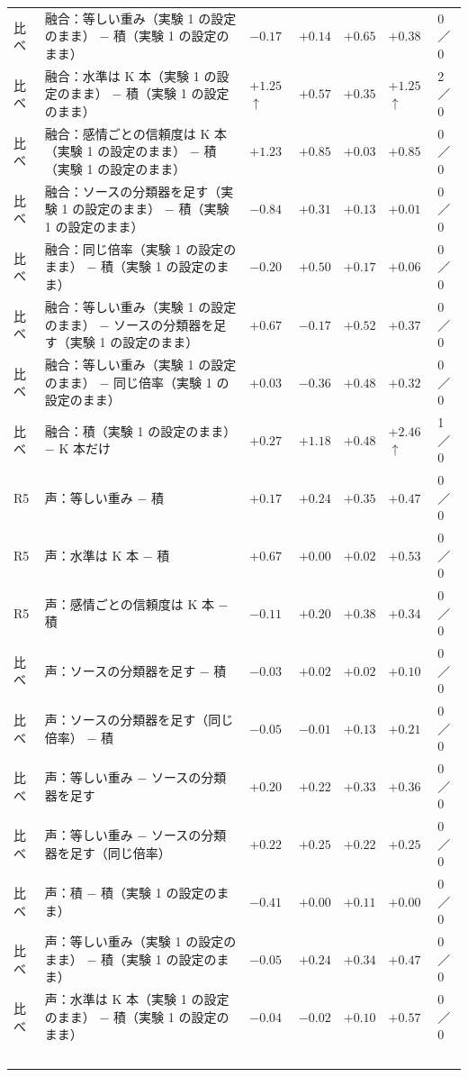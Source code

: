 \begin{longtable}{>{\raggedright}p{0.75cm}>{\raggedright}p{5.6cm}>{\raggedright}p{2.05cm}>{\raggedright}p{2.05cm}>{\raggedright}p{2.05cm}>{\raggedright}p{2.05cm}p{0.75cm}}
比べ & 融合：等しい重み（実験 1 の設定のまま） − 積（実験 1 の設定のまま） & $-0.17$ & $+0.14$ & $+0.65$ & $+0.38$ & 0／0 \\
比べ & 融合：水準は K 本（実験 1 の設定のまま） − 積（実験 1 の設定のまま） & $+1.25$$\uparrow$ & $+0.57$ & $+0.35$ & $+1.25$$\uparrow$ & 2／0 \\
比べ & 融合：感情ごとの信頼度は K 本（実験 1 の設定のまま） − 積（実験 1 の設定のまま） & $+1.23$ & $+0.85$ & $+0.03$ & $+0.85$ & 0／0 \\
比べ & 融合：ソースの分類器を足す（実験 1 の設定のまま） − 積（実験 1 の設定のまま） & $-0.84$ & $+0.31$ & $+0.13$ & $+0.01$ & 0／0 \\
比べ & 融合：同じ倍率（実験 1 の設定のまま） − 積（実験 1 の設定のまま） & $-0.20$ & $+0.50$ & $+0.17$ & $+0.06$ & 0／0 \\
比べ & 融合：等しい重み（実験 1 の設定のまま） − ソースの分類器を足す（実験 1 の設定のまま） & $+0.67$ & $-0.17$ & $+0.52$ & $+0.37$ & 0／0 \\
比べ & 融合：等しい重み（実験 1 の設定のまま） − 同じ倍率（実験 1 の設定のまま） & $+0.03$ & $-0.36$ & $+0.48$ & $+0.32$ & 0／0 \\
比べ & 融合：積（実験 1 の設定のまま） − K 本だけ & $+0.27$ & $+1.18$ & $+0.48$ & $+2.46$$\uparrow$ & 1／0 \\
\midrule
R5 & 声：等しい重み − 積 & $+0.17$ & $+0.24$ & $+0.35$ & $+0.47$ & 0／0 \\
R5 & 声：水準は K 本 − 積 & $+0.67$ & $+0.00$ & $+0.02$ & $+0.53$ & 0／0 \\
R5 & 声：感情ごとの信頼度は K 本 − 積 & $-0.11$ & $+0.20$ & $+0.38$ & $+0.34$ & 0／0 \\
比べ & 声：ソースの分類器を足す − 積 & $-0.03$ & $+0.02$ & $+0.02$ & $+0.10$ & 0／0 \\
比べ & 声：ソースの分類器を足す（同じ倍率） − 積 & $-0.05$ & $-0.01$ & $+0.13$ & $+0.21$ & 0／0 \\
比べ & 声：等しい重み − ソースの分類器を足す & $+0.20$ & $+0.22$ & $+0.33$ & $+0.36$ & 0／0 \\
比べ & 声：等しい重み − ソースの分類器を足す（同じ倍率） & $+0.22$ & $+0.25$ & $+0.22$ & $+0.25$ & 0／0 \\
比べ & 声：積 − 積（実験 1 の設定のまま） & $-0.41$ & $+0.00$ & $+0.11$ & $+0.00$ & 0／0 \\
比べ & 声：等しい重み（実験 1 の設定のまま） − 積（実験 1 の設定のまま） & $-0.05$ & $+0.24$ & $+0.34$ & $+0.47$ & 0／0 \\
比べ & 声：水準は K 本（実験 1 の設定のまま） − 積（実験 1 の設定のまま） & $-0.04$ & $-0.02$ & $+0.10$ & $+0.57$ & 0／0 \\
$$
\end{longtable}
